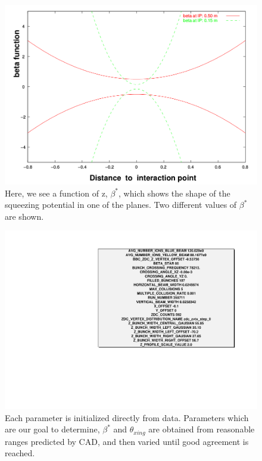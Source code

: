 \begin{figure}
  \centering
  \includegraphics[width=\linewidth,height=\textheight,keepaspectratio]{./figures/beta_function}
  \caption{
    Here, we see a function of z, $\beta^{*}$, which shows the shape of the
    squeezing potential in one of the planes. Two different values of
    $\beta^{*}$ are shown.
  }
  \label{fig:beta_function}
\end{figure}
\clearpage

\begin{figure}[ht]
  \centering
  \includegraphics[width=\linewidth,height=\textheight,keepaspectratio]{./figures/sample_configuration}
  \caption{
    Each parameter is initialized directly from data. Parameters which are our
    goal to determine, $\beta^{*}$ and $\theta_{xing}$ are obtained from
    reasonable ranges predicted by CAD, and then varied until good agreement is
    reached.
  }
  \label{fig:sample_configuration}
\end{figure}

